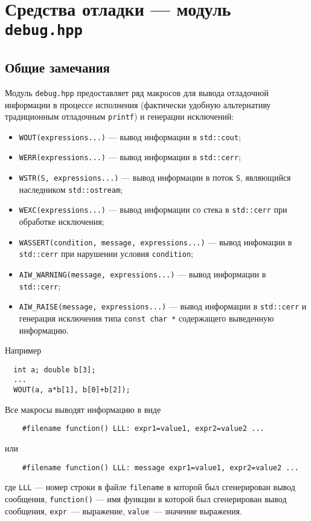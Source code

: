 \section{Средства отладки --- модуль {\tt debug.hpp}}
\subsection{Общие замечания}
Модуль \verb'debug.hpp' предоставляет ряд макросов для вывода отладочной информации в процессе исполнения
(фактически удобную альтернативу традиционным отладочным \verb'printf') и генерации исключений:
\begin{itemize}
  \item\verb'WOUT(expressions...)' --- вывод информации в \verb'std::cout';
  \item\verb'WERR(expressions...)' --- вывод информации в \verb'std::cerr';
  \item\verb'WSTR(S, expressions...)' --- вывод информации в поток \verb'S', являющийся наследником \verb'std::ostream';
  \item\verb'WEXC(expressions...)' --- вывод информации со стека в \verb'std::cerr' при обработке исключения; 
  \item\verb'WASSERT(condition, message, expressions...)' --- вывод инфомации в \verb'std::cerr'
    при нарушении условия \verb'condition';
  \item\verb'AIW_WARNING(message, expressions...)' --- вывод информации в \verb'std::cerr';
  \item\verb'AIW_RAISE(message, expressions...)' --- вывод информации в \verb'std::cerr'
    и генерация исключения типа \verb'const char *' содержащего выведенную информацию.
\end{itemize}
Например
\begin{verbatim}
  int a; double b[3];
  ...
  WOUT(a, a*b[1], b[0]+b[2]);
\end{verbatim}

Все макросы выводят информацию в виде
\begin{verbatim}
    #filename function() LLL: expr1=value1, expr2=value2 ...
\end{verbatim}
или
\begin{verbatim}
    #filename function() LLL: message expr1=value1, expr2=value2 ...
\end{verbatim}
где \verb'LLL' --- номер строки в файле \verb'filename' в которой был сгенерирован вывод сообщения,
\verb'function()' --- имя функции в которой был сгенерирован вывод сообщения, \verb'expr'~--- выражение,
\verb'value'~--- значение выражения.

